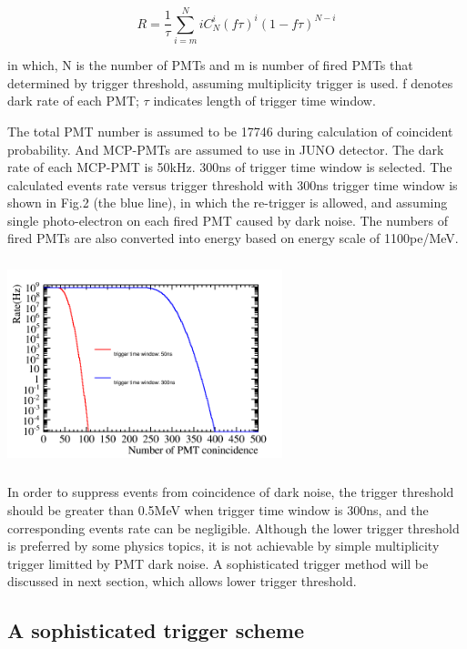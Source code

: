 \documentclass[a4paper,10pt,twoside]{paper}
\begin{document}
\begin{multicols}{2}
		\begin{displaymath}
			R = \frac{1}{\tau}\sum_{i=m}^{N}iC^{i}_{N}(f\tau)^i
			(1-f\tau)^{N-i}
		\end{displaymath}

		in which, N is the number of PMTs and m is number of fired PMTs that determined by trigger threshold, assuming multiplicity trigger is used.
		f denotes dark rate of each PMT; $\tau$ indicates length of trigger time window.

		The total PMT number is assumed to be 17746 during calculation of coincident probability. 
		And MCP-PMTs are assumed to use in JUNO detector. The dark rate of each MCP-PMT is 50kHz. 300ns of trigger time window is selected.
		The calculated events rate versus trigger threshold with 300ns trigger time window
		is shown in Fig.2 (the blue line), in which the re-trigger is allowed,
		and assuming single photo-electron on each fired PMT caused by dark noise.
		The numbers of fired PMTs are also converted into energy based on energy scale of 1100pe/MeV.

		\begin{center}
			\includegraphics[width=8cm,height=6cm]{Rate_all.png}
		\end{center}


		In order to suppress events from coincidence of dark noise, the trigger threshold should be greater than 0.5MeV when trigger time window is 300ns, 
		and the corresponding events rate can be negligible. Although the lower trigger threshold is preferred by some physics topics,
		it is not achievable by simple multiplicity trigger limitted by PMT dark noise. A sophisticated trigger method will
		be discussed in next section, which allows lower trigger threshold. 


		\subsection{A sophisticated trigger scheme}


\end{multicols}
\end{document}
